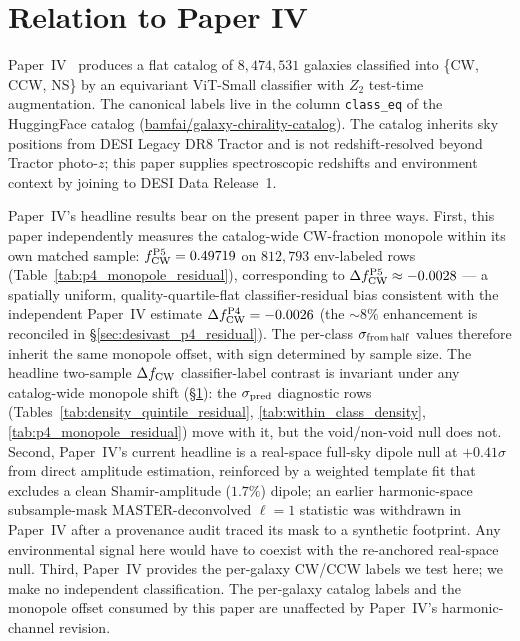 \documentclass[aps,prd,twocolumn,superscriptaddress,showpacs,preprintnumbers,nofootinbib,longbibliography,floatfix]{revtex4-2}
\begin{document}
\section{Relation to Paper IV}\label{sec:p4}

Paper~IV~\cite{golden_chirality_2026} produces a flat catalog of
$8{,}474{,}531$ galaxies classified into \{CW, CCW, NS\} by an
equivariant ViT-Small classifier with $Z_2$ test-time augmentation.
The canonical labels live in the column \texttt{class\_eq} of the
HuggingFace catalog
(\href{https://huggingface.co/datasets/bamfai/galaxy-chirality-catalog}%
{bamfai/galaxy-chirality-catalog}). The catalog inherits sky positions from
DESI Legacy DR8 Tractor and is not redshift-resolved beyond Tractor
photo-$z$; this paper supplies spectroscopic redshifts and environment
context by joining to DESI Data Release~1.

Paper~IV's headline results bear on the present paper in three ways.
First, this paper independently measures the catalog-wide CW-fraction
monopole within its own matched sample: $f_{\rm CW}^{\rm P5} =
0.49719$ on $812{,}793$ env-labeled rows
(Table~\ref{tab:p4_monopole_residual}), corresponding to
$\Delta f_{\rm CW}^{\rm P5} \approx -0.0028$ --- a spatially uniform,
quality-quartile-flat classifier-residual bias consistent with the
independent Paper~IV estimate $\Delta f_{\rm CW}^{\rm P4} = -0.0026$
(the ${\sim}8\%$ enhancement is reconciled in \S\ref{sec:desivast_p4_residual}).
The per-class $\sigma_{\rm from\,half}$ values therefore inherit the
same monopole offset, with sign determined by sample size. The
headline two-sample $\Delta f_{\rm CW}$ classifier-label contrast is
invariant under any catalog-wide monopole shift
(\S\ref{sec:p4}): the $\sigma_{\rm pred}$ diagnostic rows
(Tables~\ref{tab:density_quintile_residual},
\ref{tab:within_class_density}, \ref{tab:p4_monopole_residual}) move
with it, but the void/non-void null does not. Second,
Paper~IV's current headline is a real-space full-sky dipole
null at $+0.41\sigma$ from direct amplitude estimation,
reinforced by a weighted template fit that excludes a clean
Shamir-amplitude ($1.7\%$) dipole; an earlier harmonic-space
subsample-mask MASTER-deconvolved $\ell\!=\!1$ statistic was withdrawn
in Paper~IV after a provenance audit traced its mask to a
synthetic footprint. Any environmental signal
here would have to coexist with the re-anchored real-space null. Third,
Paper~IV provides
the per-galaxy CW/CCW labels we test here; we make no independent
classification. The per-galaxy catalog labels and the monopole offset
consumed by this paper are unaffected by Paper~IV's harmonic-channel
revision.
\end{document}
